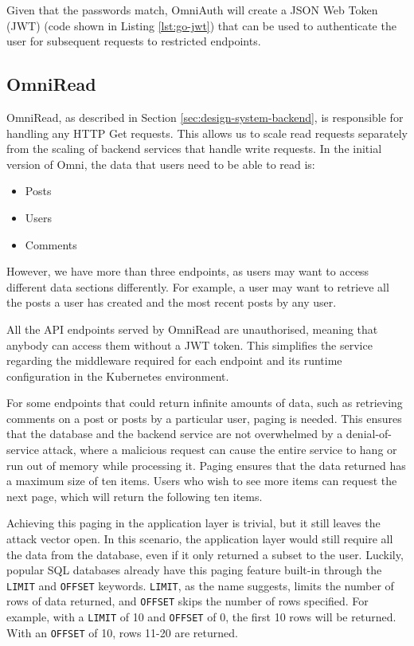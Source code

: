 Given that the passwords match, OmniAuth will create a JSON Web Token (JWT) (code shown in Listing \ref{lst:go-jwt}) that can be used to authenticate the user for subsequent requests to restricted endpoints.



\subsection{OmniRead}
OmniRead, as described in Section \ref{sec:design-system-backend}, is responsible for handling any HTTP Get requests. This allows us to scale read requests separately from the scaling of backend services that handle write requests.
In the initial version of Omni, the data that users need to be able to read is: 
\begin{itemize}
    \item Posts
    \item Users
    \item Comments
\end{itemize}
However, we have more than three endpoints, as users may want to access different data sections differently. For example, a user may want to retrieve all the posts a user has created and the most recent posts by any user. 

All the API endpoints served by OmniRead are unauthorised, meaning that anybody can access them without a JWT token. This simplifies the service regarding the middleware required for each endpoint and its runtime configuration in the Kubernetes environment. 

For some endpoints that could return infinite amounts of data, such as retrieving comments on a post or posts by a particular user, paging is needed.
This ensures that the database and the backend service are not overwhelmed by a denial-of-service attack, where a malicious request can cause the entire service to hang or run out of memory while processing it. 
Paging ensures that the data returned has a maximum size of ten items. Users who wish to see more items can request the next page, which will return the following ten items.

Achieving this paging in the application layer is trivial, but it still leaves the attack vector open. In this scenario, the application layer would still require all the data from the database, even if it only returned a subset to the user. 
Luckily, popular SQL databases already have this paging feature built-in through the \verb|LIMIT| and \verb|OFFSET| keywords.
\verb|LIMIT|, as the name suggests, limits the number of rows of data returned, and \verb|OFFSET| skips the number of rows specified.
For example, with a \verb|LIMIT| of 10 and \verb|OFFSET| of 0, the first 10 rows will be returned. With an \verb|OFFSET| of 10, rows 11-20 are returned. 

